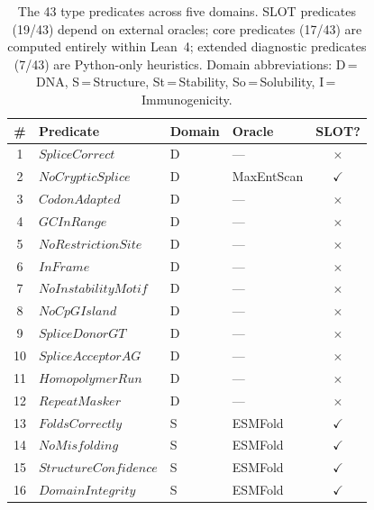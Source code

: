 \begin{table}[t]
\centering
\caption{The 43 type predicates across five domains. SLOT predicates
         (19/43) depend on external oracles; core predicates (17/43)
         are computed entirely within Lean~4; extended diagnostic
         predicates (7/43) are Python-only heuristics.
         Domain abbreviations: D\,=\,DNA, S\,=\,Structure,
         St\,=\,Stability, So\,=\,Solubility, I\,=\,Immunogenicity.}
\label{tab:predicates43}
\begin{tabular}{clllc}
\toprule
\textbf{\#} & \textbf{Predicate} & \textbf{Domain} &
  \textbf{Oracle} & \textbf{SLOT?} \\
\midrule
 1 & $\mathit{SpliceCorrect}$          & D  & ---                   & $\times$ \\
 2 & $\mathit{NoCrypticSplice}$        & D  & MaxEntScan            & $\checkmark$ \\
 3 & $\mathit{CodonAdapted}$           & D  & ---                   & $\times$ \\
 4 & $\mathit{GCInRange}$              & D  & ---                   & $\times$ \\
 5 & $\mathit{NoRestrictionSite}$      & D  & ---                   & $\times$ \\
 6 & $\mathit{InFrame}$                & D  & ---                   & $\times$ \\
 7 & $\mathit{NoInstabilityMotif}$     & D  & ---                   & $\times$ \\
 8 & $\mathit{NoCpGIsland}$            & D  & ---                   & $\times$ \\
 9 & $\mathit{SpliceDonorGT}$          & D  & ---                   & $\times$ \\
10 & $\mathit{SpliceAcceptorAG}$       & D  & ---                   & $\times$ \\
11 & $\mathit{HomopolymerRun}$         & D  & ---                   & $\times$ \\
12 & $\mathit{RepeatMasker}$           & D  & ---                   & $\times$ \\
\midrule
13 & $\mathit{FoldsCorrectly}$         & S  & ESMFold               & $\checkmark$ \\
14 & $\mathit{NoMisfolding}$           & S  & ESMFold               & $\checkmark$ \\
15 & $\mathit{StructureConfidence}$    & S  & ESMFold               & $\checkmark$ \\
16 & $\mathit{DomainIntegrity}$        & S  & ESMFold               & $\checkmark$ \\

\end{tabular}
\end{table}
